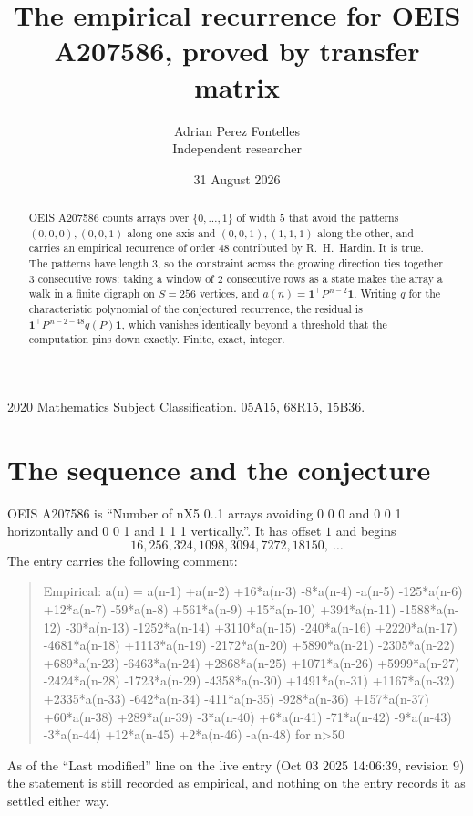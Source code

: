 \documentclass[11pt,a4paper]{article}
\title{The empirical recurrence for OEIS A207586, proved by transfer matrix}
\author{Adrian Perez Fontelles\\ \small Independent researcher}
\date{31 August 2026}
\theoremstyle{plain}
\theoremstyle{definition}
\begin{document}
\maketitle

\begin{abstract}
OEIS A207586 counts arrays over $\{0,\dots,1\}$ of width $5$ that avoid the patterns
$(0,0,0), (0,0,1)$ along one axis and $(0,0,1), (1,1,1)$ along the other, and carries an empirical recurrence of
order $48$ contributed by R.~H.~Hardin. It is true. The patterns have length $3$, so
the constraint across the growing direction ties together $3$ consecutive rows: taking a
window of $2$ consecutive rows as a state makes the array a walk in a finite digraph
on $S=256$ vertices, and $a(n)=\mathbf{1}^{\!\top}P^{\,n-2}\mathbf{1}$. Writing $q$
for the characteristic polynomial of the conjectured recurrence, the residual is
$\mathbf{1}^{\!\top}P^{\,n-2-48}q(P)\mathbf{1}$, which vanishes identically
beyond a threshold that the computation pins down exactly. Finite, exact, integer.
\end{abstract}

\noindent\small 2020 Mathematics Subject Classification. 05A15, 68R15, 15B36.\normalsize

\section{The sequence and the conjecture}

OEIS A207586 is ``Number of nX5 0..1 arrays avoiding 0 0 0 and 0 0 1 horizontally and 0 0 1 and 1 1 1 vertically.''. It has offset
$1$ and begins
\[
16, 256, 324, 1098, 3094, 7272, 18150,\ \dots
\]
The entry carries the following comment:
\begin{quote}\small
Empirical: a(n) = a(n-1) +a(n-2) +16*a(n-3) -8*a(n-4) -a(n-5) -125*a(n-6) +12*a(n-7) -59*a(n-8) +561*a(n-9) +15*a(n-10) +394*a(n-11) -1588*a(n-12) -30*a(n-13) -1252*a(n-14) +3110*a(n-15) -240*a(n-16) +2220*a(n-17) -4681*a(n-18) +1113*a(n-19) -2172*a(n-20) +5890*a(n-21) -2305*a(n-22) +689*a(n-23) -6463*a(n-24) +2868*a(n-25) +1071*a(n-26) +5999*a(n-27) -2424*a(n-28) -1723*a(n-29) -4358*a(n-30) +1491*a(n-31) +1167*a(n-32) +2335*a(n-33) -642*a(n-34) -411*a(n-35) -928*a(n-36) +157*a(n-37) +60*a(n-38) +289*a(n-39) -3*a(n-40) +6*a(n-41) -71*a(n-42) -9*a(n-43) -3*a(n-44) +12*a(n-45) +2*a(n-46) -a(n-48) for n>50
\end{quote}
As of the ``Last modified'' line on the live entry (Oct 03 2025 14:06:39, revision
9) the statement is still recorded as empirical, and nothing on the entry
records it as settled either way.
\end{document}
